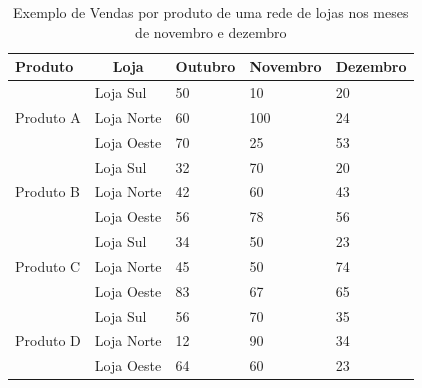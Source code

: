 \begin{table}[ht]
\centering
\begin{tabular}{|l|l|l|l|l|}
\hline
Produto                                          & \multicolumn{1}{|c|}{Loja} & Outubro & Novembro & Dezembro \\ \hline

\multicolumn{1}{|c|}{\multirow{3}{*}{Produto A}} & Loja Sul                   & 50      & 10       & 20       \\ \cline{2-5} 
& Loja Norte                 & 60      & 100      & 24       \\ \cline{2-5} 
& Loja Oeste                 & 70      & 25       & 53       \\ \hline

\multirow{3}{*}{Produto B}                       & Loja Sul                   & 32      & 70       & 20       \\ \cline{2-5} 
& Loja Norte                 & 42      & 60       & 43       \\ \cline{2-5}

& Loja Oeste                 & 56      & 78       & 56       \\ \hline


\multirow{3}{*}{Produto C}                       & Loja Sul                   & 34      & 50       & 23       \\ \cline{2-5} 
& Loja Norte                 & 45      & 50       & 74       \\ \cline{2-5} 
& Loja Oeste                 & 83      & 67       & 65       \\ \hline


\multirow{3}{*}{Produto D}                       & Loja Sul                   & 56      & 70       & 35       \\ \cline{2-5} 
& Loja Norte                 & 12      & 90       & 34       \\ \cline{2-5} 
& Loja Oeste                 & 64      & 60       & 23       \\ \hline

\end{tabular}
\caption{Exemplo de Vendas por produto de uma rede de lojas nos meses de novembro e dezembro}
\label{before-slice}
\end{table}


